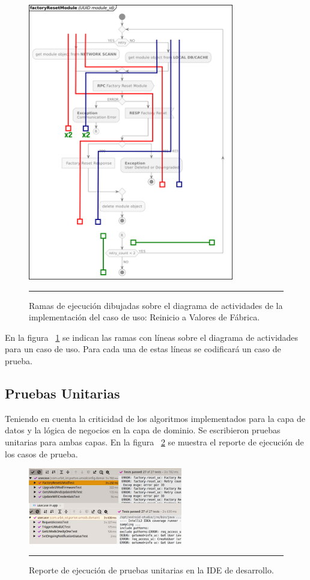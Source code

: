 \begin{figure}[htbp]
	\centering
	\includegraphics[width=0.8\textwidth]{Figures/iter2/ACT_factoryResetModule_branches_ink.png}
	\rule{35em}{1pt}
	\caption[Ramas sobre Caso de Uso]{Ramas de ejecución dibujadas sobre el diagrama de actividades de la implementación del caso de uso: Reinicio a Valores de Fábrica.}
	\label{fig:act_act_test_branches}
\end{figure}

En la figura ~\ref{fig:act_act_test_branches} se indican las ramas con líneas sobre el diagrama de actividades para un caso de uso. Para cada una de estas líneas se codificará un caso de prueba.

\subsection{Pruebas Unitarias}
Teniendo en cuenta la criticidad de los algoritmos implementados para la capa de datos y la lógica de negocios en la capa de dominio. Se escribieron pruebas unitarias para ambas capas. En la figura ~\ref{fig:tests_ss} se muestra el reporte de ejecución de los casos de prueba. 

\begin{figure}[H]
	\centering
	\includegraphics[width=0.6\textwidth]{Figures/iter2/tests_all.png}
	\rule{35em}{1pt}
	\caption[Captura Pruebas Unitarias]{Reporte de ejecución de pruebas unitarias en la IDE de desarrollo.}
	\label{fig:tests_ss}
\end{figure}

